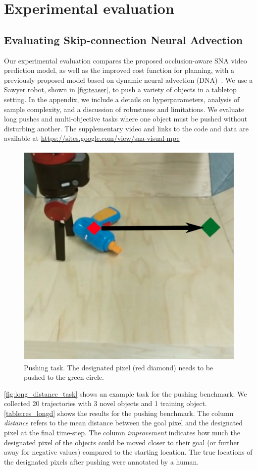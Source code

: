 \section{Experimental evaluation}

\subsection{Evaluating Skip-connection Neural Advection}
Our experimental evaluation compares the proposed occlusion-aware SNA video prediction model, as well as the improved cost function for planning, with a previously proposed model based on dynamic neural advection (DNA)~\cite{foresight}. We use a Sawyer robot, shown in \autoref{fig:teaser}, to push a variety of objects in a tabletop setting. In the appendix, we include a details on hyperparameters, analysis of sample complexity, and a discussion of robustness and limitations. We evaluate long pushes and multi-objective tasks where one object must be pushed without disturbing another. The supplementary video and links to the code and data are available at \url{https://sites.google.com/view/sna-visual-mpc}

\begin{figure}
\centering
\includegraphics[width=0.30\columnwidth]{images_sna/longdistance_pushing/pushing.pdf}
\caption{
Pushing task. The designated pixel (red diamond) needs to be pushed to the green circle.
\label{fig:long_distance_task}
}
\end{figure}
\autoref{fig:long_distance_task} shows an example task for the pushing benchmark. We collected 20 trajectories with 3 novel objects and 1 training object. \autoref{table:res_longd} shows the results for the pushing benchmark. The column \textit{distance} refers to the mean distance between the goal pixel and the designated pixel at the final time-step. The column \textit{improvement} indicates how much the designated pixel of the objects could be moved closer to their goal (or further away for negative values) compared to the starting location. The true locations of the designated pixels after pushing were annotated by a human. 

